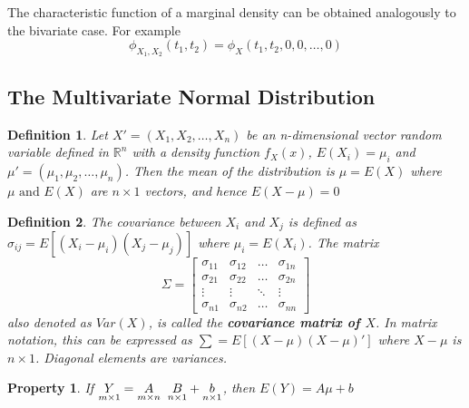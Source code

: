 \documentclass{article}
\newtheorem{definition}{Definition}[section]
\begin{document}
The characteristic function of a marginal density can be obtained analogously to the bivariate case. For example
\begin{equation*}
    \phi_{X_1,X_2}(t_1,t_2)=\phi_X(t_1,t_2,0,0,\dots,0)
\end{equation*}

\subsection{The Multivariate Normal Distribution}

\begin{definition}
    Let \(X'=(X_1,X_2,\dots,X_n)\) be an n-dimensional vector random variable defined in $\mathbb{R}^n$ with a density function \(f_X(x)\), \(E(X_i)=\mu_i\) and \(\mu'=(\mu_1,\mu_2,\dots,\mu_n)\). Then the mean of the distribution is \(\mu=E(X)\) where \(\mu \text{ and } E(X)\) are \(n \times 1\) vectors, and hence \(E(X-\mu)=0\)
\end{definition}

\begin{definition}
    The covariance between \(X_i\) and \(X_j\) is defined as \(\sigma_{ij}=E[(X_i-\mu_i)(X_j-\mu_j)]\) where \(\mu_i=E(X_i)\). The matrix
    \begin{equation*}
    \Sigma = 
    \begin{bmatrix}
        \sigma_{11} & \sigma_{12} & \dots & \sigma_{1n} \\
        \sigma_{21} & \sigma_{22} & \dots & \sigma_{2n}
        \\ \vdots & \vdots & \ddots & \vdots \\
        \sigma_{n1} & \sigma_{n2} & \dots & \sigma_{nn}
    \end{bmatrix}
    \end{equation*}
also denoted as \(Var(X)\), is called the \textbf{covariance matrix of \(X\)}. In matrix notation, this can be expressed as \(\sum=E[(X-\mu)(X-\mu)']\) where \(X-\mu\) is \(n \times 1\). \emph{Diagonal elements are variances}.
\end{definition}

\newtheorem{property}{Property}[section]

\begin{property}
    If \( \underset{\substack{m \times 1}}{Y} =\underset{\substack{m \times n}}{A} \hspace{0.2cm} \underset{\substack n \times 1}{B} +\underset{\substack{n \times 1}}{b}\), then \(E(Y)=A\mu+b\)
\end{property}
\end{document}
